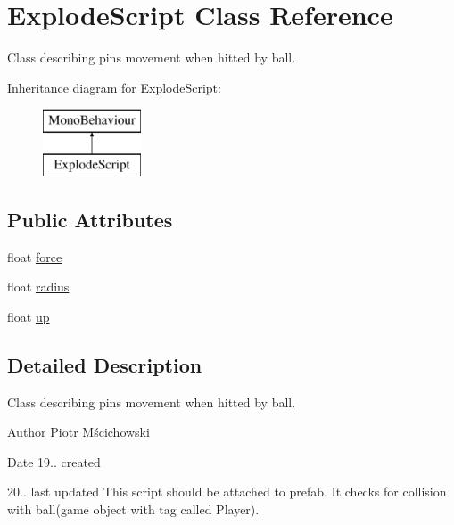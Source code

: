 \hypertarget{class_explode_script}{}\section{Explode\+Script Class Reference}
\label{class_explode_script}


Class describing pins movement when hitted by ball.  


Inheritance diagram for Explode\+Script\+:\begin{figure}[H]
\begin{center}
\leavevmode
\includegraphics[height=2.000000cm]{class_explode_script}
\end{center}
\end{figure}
\subsection*{Public Attributes}
\begin{DoxyCompactItemize}
\item 
float \hyperlink{class_explode_script_af825236ec0516f880ea50d9bb33c81a1}{force}
\item 
float \hyperlink{class_explode_script_ae208b9d0052339eea0edd81f562b481a}{radius}
\item 
float \hyperlink{class_explode_script_abc4124d039024e334dd726d85c49396e}{up}
\end{DoxyCompactItemize}


\subsection{Detailed Description}
Class describing pins movement when hitted by ball. 

\begin{DoxyAuthor}{Author}
Piotr Mścichowski 
\end{DoxyAuthor}
\begin{DoxyDate}{Date}
19.. created 

20.. last updated This script should be attached to prefab. It checks for collision with ball(game object with tag called \textquotesingle{}Player\textquotesingle{}). 
\end{DoxyDate}


